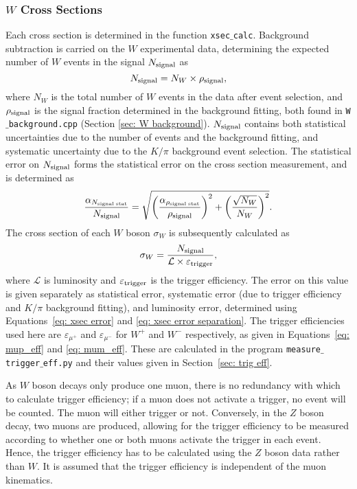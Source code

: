\documentclass[a4paper,12pt]{article}
\begin{document}
\subsubsection{$W$ Cross Sections} 
Each cross section is determined in the function \texttt{xsec$\_$calc}. Background subtraction is carried on the $W$ experimental data, determining the expected number of $W$ events in the signal $N_{\rm signal}$ as
\begin{equation}
    N_{\rm signal} = N_W \times \rho_{\rm signal},
    \label{eq: signal frac}
\end{equation}
where $N_W$ is the total number of $W$ events in the data after event selection, and $\rho_{\rm signal}$ is the signal fraction determined in the background fitting, both found in \texttt{W$\_$background.cpp} (Section \ref{sec: W background}). 
$N_{\rm signal}$ contains both statistical uncertainties due to the number of events and the background fitting, and systematic uncertainty due to the $K/\pi$ background event selection.
The statistical error on $N_{\rm signal}$ forms the statistical error on the cross section measurement, and is determined as
\begin{equation}
    \frac{\alpha_{N_{\rm signal \; stat}}}{N_{\rm signal}} = \sqrt{\left(\frac{\alpha_{\rho_{\rm signal \; stat}}}{\rho_{\rm signal}}\right)^2 + \left(\frac{\sqrt{N_W}}{N_W}\right)^2} .
\end{equation}
The cross section of each $W$ boson $\sigma_W$ is subsequently calculated as
\begin{equation}
    \sigma_W = \frac{N_{\rm signal}}{\mathcal{L} \times \varepsilon_{\rm trigger}},
    \label{eq: W_xsec}
\end{equation}
where $\mathcal{L}$ is luminosity and $\varepsilon_{\rm trigger}$ is the trigger efficiency. The error on this value is given separately as statistical error, systematic error (due to trigger efficiency and $K/\pi$ background fitting), and luminosity error, determined using Equations~\ref{eq: xsec error} and \ref{eq: xsec error separation}.
The trigger efficiencies used here are $\varepsilon_{\mu^+}$ and $\varepsilon_{\mu^-}$ for $W^+$ and $W^-$ respectively, as given in Equations~\ref{eq: mup_eff} and \ref{eq: mum_eff}. These are calculated in the program \texttt{measure$\_$trigger$\_$eff.py} and their values given in Section~\ref{sec: trig eff}. 

As $W$ boson decays only produce one muon, there is no redundancy with which to calculate trigger efficiency; if a muon does not activate a trigger, no event will be counted. The muon will either trigger or not. Conversely, in the $Z$ boson decay, two muons are produced, allowing for the trigger efficiency to be measured according to whether one or both muons activate the trigger in each event. Hence, the trigger efficiency has to be calculated using the $Z$ boson data rather than $W$. It is assumed that the trigger efficiency is independent of the muon kinematics.
\end{document}
